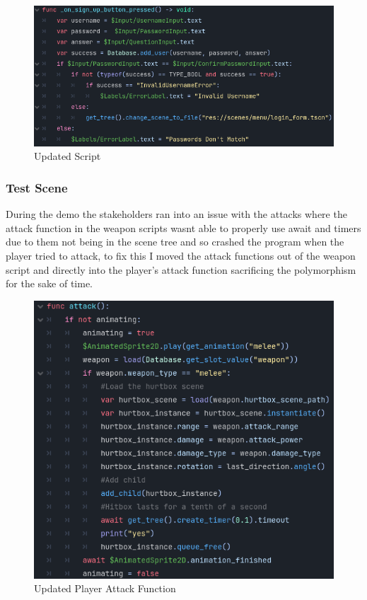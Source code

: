 \documentclass{article}
\begin{document}
        \begin{figure}[H]
                \centering
                \includegraphics[width = \columnwidth]{images/development/CreateAccountForm_create2.PNG}
                \caption{Updated Script}
        \end{figure}   
        \subsubsection{Test Scene}
        During the demo the stakeholders ran into an issue with the attacks where the attack function in the weapon scripts wasnt able to properly use await and timers due to them not being in the scene tree and so crashed the program when the player tried to attack, to fix this I moved the attack functions out of the weapon script and directly into the player's attack function sacrificing the polymorphism for the sake of time.\\
        \begin{figure}[H]
                \centering
                \includegraphics[width = 0.6\columnwidth]{images/development/Player_attack2.PNG}
                \caption{Updated Player Attack Function}
        \end{figure}
\end{document}
